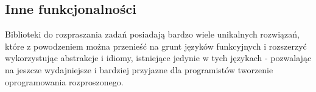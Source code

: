 \subsection*{Inne funkcjonalności}
Biblioteki do rozpraszania zadań posiadają bardzo wiele unikalnych rozwiązań, które z powodzeniem można przenieść na grunt języków funkcyjnych i rozszerzyć wykorzystując abstrakcje i idiomy, istniejące jedynie w tych językach - pozwalając na jeszcze wydajniejsze i bardziej przyjazne dla programistów tworzenie oprogramowania rozproszonego.